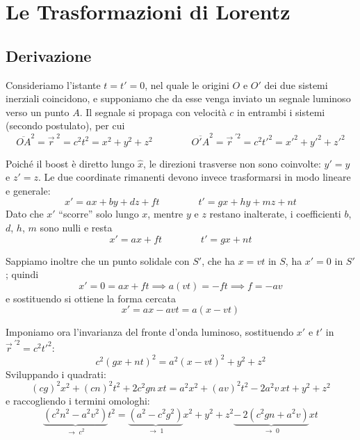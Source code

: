 \section{Le Trasformazioni di Lorentz}

\subsection{Derivazione}

Consideriamo l'istante $t = t' = 0$, nel quale le origini $O$ e $O'$ dei due sistemi inerziali coincidono, e supponiamo che da esse venga inviato un segnale luminoso verso un punto $A$. Il segnale si propaga con velocità $c$ in entrambi i sistemi (secondo postulato), per cui
\begin{equation}
    \overline{OA}^2 = \vec{r}^{\;2} = c^2 t^2 = x^2 + y^2 + z^2
    \qquad\qquad
    \overline{O'A}^2 = \vec{r}^{\;\prime 2} = c^2 t'^2 = x'^2 + y'^2 + z'^2
\end{equation}

Poiché il boost è diretto lungo $\hat{x}$, le direzioni trasverse non sono coinvolte: $y' = y$ e $z' = z$. Le due coordinate rimanenti devono invece trasformarsi in modo lineare e generale:
\begin{equation*}
    x' = ax + by + dz + ft
    \qquad\qquad
    t' = gx + hy + mz + nt
\end{equation*}
Dato che $x'$ ``scorre'' solo lungo $x$, mentre $y$ e $z$ restano inalterate, i coefficienti $b$, $d$, $h$, $m$ sono nulli e resta
\begin{equation*}
    x' = ax + ft
    \qquad\qquad
    t' = gx + nt
\end{equation*}

Sappiamo inoltre che un punto solidale con $S'$, che ha $x = vt$ in $S$, ha $x' = 0$ in $S'$; quindi
\begin{equation*}
    x' = 0 = ax + ft \implies a(vt) = -ft \implies f = -av
\end{equation*}
e sostituendo si ottiene la forma cercata
\begin{equation}
    x' = ax - avt = a(x - vt)
\end{equation}

Imponiamo ora l'invarianza del fronte d'onda luminoso, sostituendo $x'$ e $t'$ in $\vec{r}^{\;\prime 2} = c^2t'^2$:
\begin{equation}
    c^2 (gx + nt)^2 = a^2 (x - vt)^2 + y^2 + z^2
\end{equation}
Sviluppando i quadrati:
\begin{equation*}
    (cg)^2 x^2 + (cn)^2 t^2 + 2c^2 gn \, xt = a^2 x^2 + (av)^2 t^2 - 2a^2 v \, xt + y^2 + z^2
\end{equation*}
e raccogliendo i termini omologhi:
\begin{equation}
    \underbrace{\left(c^2 n^2 - a^2 v^2\right)}_{\to \; c^2} t^2 =
    \underbrace{\left(a^2 - c^2 g^2\right)}_{\to \; 1} x^2 + y^2 + z^2
    \underbrace{- \, 2\left(c^2 gn + a^2 v\right)}_{\to \; 0} xt
\end{equation}

